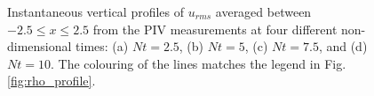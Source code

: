 \documentclass{piv13-abstract}
\newcommand{\figLabel}{Fig. }
\begin{document}
\begin{figure}[h]
\centering
{}
\caption{Instantaneous vertical profiles of $u_{rms}$ averaged between $-2.5 \le x \le 2.5$ from the PIV measurements at four different non-dimensional times: (a) $Nt=2.5$, (b) $Nt=5$, (c) $Nt = 7.5$, and (d) $Nt = 10$. The colouring of the lines matches the legend in \figLabel\ref{fig:rho_profile}. \label{fig:urms_profile}}
\end{figure}
\end{document}
